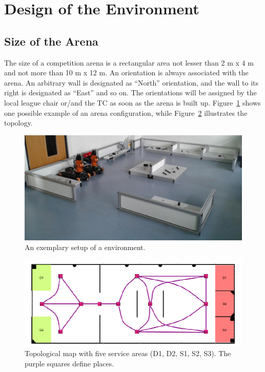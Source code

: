 \section{Design of the Environment}
\label{sec:ArenaDesign}
\subsection{Size of the Arena}

The size of a competition arena is a rectangular area not lesser than 2 m x 4 m and not more than 10 m x 12 m.
An orientation is always associated with the arena. An arbitrary wall is designated as “North” orientation, and the wall to its right is designated as “East” and so on. The orientations will be assigned by the local league chair or/and the TC as soon as the arena is built up. Figure~\ref{fig:example_arena} shows one possible example of an arena configuration, while Figure~\ref{fig:example_topological_map} illustrates the topology.

\begin{figure} [h!]

\includegraphics[width= \textwidth ]{./images/example_arena.jpg}
\caption{An exemplary setup of a \RCAW environment.}
\label{fig:example_arena}
\end{figure}

\begin{figure} [h!]
\includegraphics[width= \textwidth ]{./images/example_map.png}
\caption{Topological map with five service areas (D1, D2, S1, S2, S3). The purple squares define places.}
\label{fig:example_topological_map}
\end{figure}


